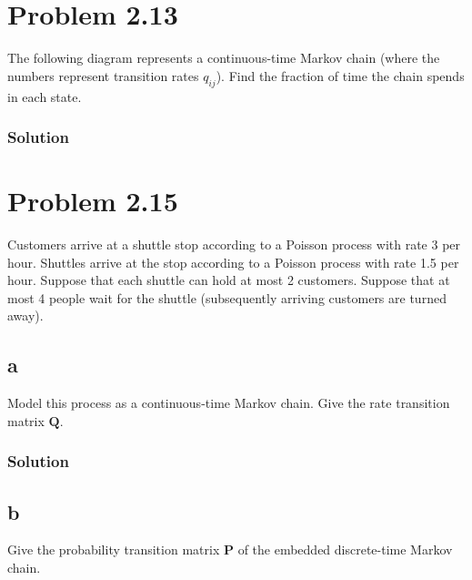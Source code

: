 \documentclass{amsart}
\begin{document}
\section{Problem 2.13} %
The following diagram represents a continuous-time Markov chain (where
the numbers represent transition rates $q_{ij}$). Find the fraction of time the
chain spends in each state.
\begin{figure}[!h]
\end{figure}

\subsubsection*{Solution}

\section{Problem 2.15} %
Customers arrive at a shuttle stop according to a Poisson process with rate 3
per hour. Shuttles arrive at the stop according to a Poisson process with
rate 1.5 per hour. Suppose that each shuttle can hold at most 2 customers.
Suppose that at most 4 people wait for the shuttle (subsequently arriving
customers are turned away).
\subsection*{a}
 Model this process as a continuous-time Markov chain. Give the rate
 transition matrix $\mathbf{Q}$.
 \subsubsection*{Solution}
\subsection*{b}
Give the probability transition matrix $\mathbf{P}$ of the embedded discrete-time
Markov chain.
\end{document}

